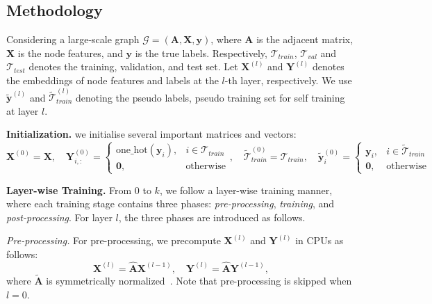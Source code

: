 \message{ !name(main.tex)}\documentclass{article}
\newcommand{\bm}[1]{\mathbf{#1}}
\begin{document}
\vspace{-2mm}
\subsection{Methodology}\label{sec:engcn_methodology}
\vspace{-2mm}
Considering a large-scale graph \(\mathcal{G}=(\bm{A}, \bm{X}, \bm{y})\), where \(\bm{A}\) is the adjacent matrix, \(\bm{X}\) is the node features, and \(\bm{y}\) is the true labels. Respectively, \(\mathcal{T}_{train}\), \(\mathcal{T}_{val}\) and \(\mathcal{T}_{test}\) denotes the training, validation, and test set. Let \(\bm{X}^{(l)}\) and \(\bm{Y}^{(l)}\) denotes the embeddings of node features and labels at the \(l\)-th layer, respectively. We use \(\tilde{\bm{y}}^{(l)}\) and \(\widetilde{\mathcal{T}}_{train}^{(l)}\) denoting the pseudo labels, pseudo training set for self training at layer \(l\).

\textbf{Initialization.} we initialise several important matrices and vectors:
\begin{equation*}
	\bm{X}^{(0)}=\bm{X}, \quad \bm{Y}^{(0)}_{i,:} = \begin{cases}
		\text{one\_hot}(\bm{y}_{i}), & i \in \mathcal{T}_{train} \\
		\bm{0},                      & \text{otherwise}\end{cases}, \quad \widetilde{\mathcal{T}}^{(0)}_{train} = \mathcal{T}_{train}, \quad \tilde{\bm{y}}^{(0)}_{i} = \begin{cases}
		\bm{y}_{i}, & i \in \widetilde{\mathcal{T}}_{train} \\
		\bm{0},     & \text{otherwise}\end{cases}
\end{equation*}

\textbf{Layer-wise Training.}
From \(0\) to \(k\), we follow a layer-wise training manner, where each training stage contains three phases: \textit{pre-processing}, \textit{training}, and \textit{post-processing}. For layer \(l\), the three phases are introduced as follows.

\textit{Pre-processing.} For pre-processing, we precompute \(\bm{X}^{(l)}\) and \(\bm{Y}^{(l)}\) in CPUs as follows:
\begin{equation}
	\bm{X}^{(l)} = \hat{\bm{A}}\bm{X}^{(l-1)}, \quad \bm{Y}^{(l)} = \hat{\bm{A}}\bm{Y}^{(l-1)},
\end{equation}
where \(\tilde{\bm{A}}\) is symmetrically normalized~\cite{kipf2016semi}. Note that pre-processing is skipped when \(l=0\).
\end{document}
